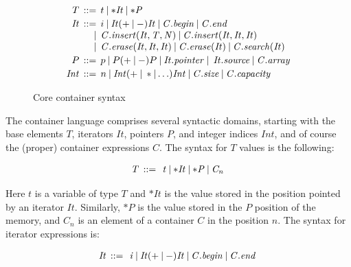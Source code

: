 \documentclass[conference]{IEEEtran}
\begin{document}
\begin{figure}
\[\begin{array}{r@{\:\:}r@{\:\:}l}
  T   & ::= & 
    t \:|\: \mathit{*It} \:|\: \mathit{*P} 
\\[0.5ex]
   \mathit{It} & ::= & 
     i \:|\: \mathit{It} (+ \:|\: -) \mathit{It}
       \:|\: \mathit{C.begin} \:|\: \mathit{C.end} 
\\  & | & 
     \mathit{C.insert(It, T, N)} \:|\: \mathit{C.insert(It, It, It)}
\\  & | & 
     \mathit{C.erase(It, It, It)} \:|\: \mathit{C.erase(It)} \:|\: \mathit{C.search(It)}
\\[0.5ex]
   P  & ::= & 
     p \:|\: P (+ \:|\: - ) P
       \:|\: \mathit{It.pointer} \:|\: \: \mathit{It.source}
       \:|\: \mathit{C.array}
\\[0.5ex]
  \mathit{Int}  & ::= & 
     n \:|\: \mathit{Int} (+ \:|\: * | \ldots) \mathit{Int}
       \:|\: \mathit{C.size} \: | \: \mathit{C.capacity}
  \end{array}
\]
  \caption{\label{ccl-fig}Core container syntax}
\end{figure}

The container language comprises several syntactic domains, starting with
the base elements $\mathit{T}$, iterators $\mathit{It}$, pointers $\mathit{P}$,
and integer indices $\mathit{Int}$, and of course the (proper)
container expressions $\mathit{C}$. The syntax for $\mathit{T}$
values is the following:

\[\begin{array}{r@{\:\:}c@{\:\:}l}\label{element-semantics}
\mathit{T}   & ::= & \: \mathit{t} \: | \: \mathit{*It} \: | \: \mathit{*P} \: | \: \mathit{C_n} \:  
\end{array}
\]

\noindent
Here $\mathit{t}$ is a variable of type $\mathit{T}$ and
$\mathit{*It}$ is the value stored in the position pointed
by an iterator $\mathit{It}$. Similarly, $\mathit{*P}$ is the value
stored in the $\mathit{P}$ position of the memory, and $\mathit{C_n}$ is
an element of a container $\mathit{C}$ in the position $\mathit{n}$.
The syntax for iterator expressions is:

\[\begin{array}{r@{\:\:}c@{\:\:}l}\label{iterator-semantics}
\mathit{It}   & ::= & \: \mathit{i} \: | \: \mathit{It} ( + \: | \: - ) \mathit{It} \: | \: \mathit{C.begin} \: | \: \mathit{C.end} \:  
\end{array}
\]
\end{document}
